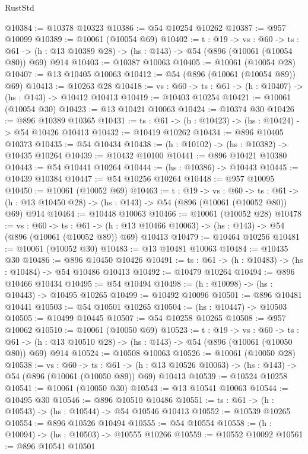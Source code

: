 \begin{lexlean}{RustStd}
\begin{coremodule}
@10384 := @10378 @10323
@10386 := @54 @10254 @10262
@10387 := @957 @10099
@10389 := @10061 (@10054 @69)
@10402 := {t : @19} ->
  {vs : @60} ->
  {ts : @61} -> (h : @13 @10389 @28) -> (hs : @143) -> @54 (@896 (@10061 (@10054 @80)) @69) @914
@10403 := @10387 @10063
@10405 := @10061 (@10054 @28)
@10407 := @13 @10405 @10063
@10412 := @54 (@896 (@10061 (@10054 @89)) @69)
@10413 := @10263 @28
@10418 := {vs : @60} -> {ts : @61} -> (h : @10407) -> (hs : @143) -> @10412 @10413
@10419 := @10403 @10254
@10421 := @10061 (@10054 @30)
@10423 := @13 @10421 @10063
@10424 := @10374 @30
@10426 := @896 @10389 @10365
@10431 := {ts : @61} -> (h : @10423) -> (hs : @10424) -> @54 @10426 @10413
@10432 := @10419 @10262
@10434 := @896 @10405 @10373
@10435 := @54 @10434
@10438 := (h : @10102) -> (hs : @10382) -> @10435 @10264
@10439 := @10432 @10100
@10441 := @896 @10421 @10380
@10443 := @54 @10441 @10264
@10444 := (hs : @10386) -> @10443
@10445 := @10439 @10384
@10447 := @54 @10256 @10264
@10448 := @957 @10095
@10450 := @10061 (@10052 @69)
@10463 := {t : @19} ->
  {vs : @60} ->
  {ts : @61} -> (h : @13 @10450 @28) -> (hs : @143) -> @54 (@896 (@10061 (@10052 @80)) @69) @914
@10464 := @10448 @10063
@10466 := @10061 (@10052 @28)
@10478 := {vs : @60} ->
  {ts : @61} ->
  (h : @13 @10466 @10063) -> (hs : @143) -> @54 (@896 (@10061 (@10052 @89)) @69) @10413
@10479 := @10464 @10256
@10481 := @10061 (@10052 @30)
@10483 := @13 @10481 @10063
@10484 := @10435 @30
@10486 := @896 @10450 @10426
@10491 := {ts : @61} -> (h : @10483) -> (hs : @10484) -> @54 @10486 @10413
@10492 := @10479 @10264
@10494 := @896 @10466 @10434
@10495 := @54 @10494
@10498 := (h : @10098) -> (hs : @10443) -> @10495 @10265
@10499 := @10492 @10096
@10501 := @896 @10481 @10441
@10503 := @54 @10501 @10265
@10504 := (hs : @10447) -> @10503
@10505 := @10499 @10445
@10507 := @54 @10258 @10265
@10508 := @957 @10062
@10510 := @10061 (@10050 @69)
@10523 := {t : @19} ->
  {vs : @60} ->
  {ts : @61} -> (h : @13 @10510 @28) -> (hs : @143) -> @54 (@896 (@10061 (@10050 @80)) @69) @914
@10524 := @10508 @10063
@10526 := @10061 (@10050 @28)
@10538 := {vs : @60} ->
  {ts : @61} ->
  (h : @13 @10526 @10063) -> (hs : @143) -> @54 (@896 (@10061 (@10050 @89)) @69) @10413
@10539 := @10524 @10258
@10541 := @10061 (@10050 @30)
@10543 := @13 @10541 @10063
@10544 := @10495 @30
@10546 := @896 @10510 @10486
@10551 := {ts : @61} -> (h : @10543) -> (hs : @10544) -> @54 @10546 @10413
@10552 := @10539 @10265
@10554 := @896 @10526 @10494
@10555 := @54 @10554
@10558 := (h : @10094) -> (hs : @10503) -> @10555 @10266
@10559 := @10552 @10092
@10561 := @896 @10541 @10501

\end{coremodule}
\end{lexlean}
